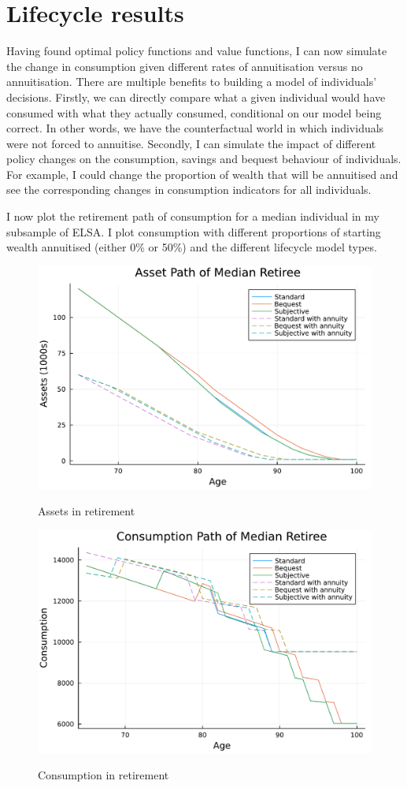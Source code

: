 \documentclass[12pt]{article}
\begin{document}
\section{Lifecycle results}

Having found optimal policy functions and value functions, I can now simulate the
change in consumption given different rates of annuitisation versus no
annuitisation. There are multiple benefits to building a model of individuals'
decisions. Firstly, we can directly compare what a given individual would have
consumed with what they actually consumed, conditional on our model being
correct. In other words, we have the counterfactual world in which individuals
were not forced to annuitise. Secondly, I can simulate the impact of different
policy changes on the consumption, savings and bequest behaviour of individuals.
For example, I could change the proportion of wealth that will be annuitised and
see the corresponding changes in consumption indicators for all individuals.

I now plot the retirement path of consumption for a median individual in my
subsample of ELSA. I plot consumption with different proportions of starting wealth
annuitised (either 0\% or 50\%) and the different lifecycle model types.

\begin{figure}[h]
    \caption{Assets in retirement}
    \centering
    \includegraphics[width=0.7\columnwidth]{figures/asset_plot_median_retiree.pdf}
    \label{fig:AssetPlot}
\end{figure}
\begin{figure}[h]
    \caption{Consumption in retirement}
    \centering
    \includegraphics[width=0.7\columnwidth]{figures/consumption_plot_median_retiree.pdf}
    \label{fig:ConsumpPlot}
\end{figure}
\end{document}
